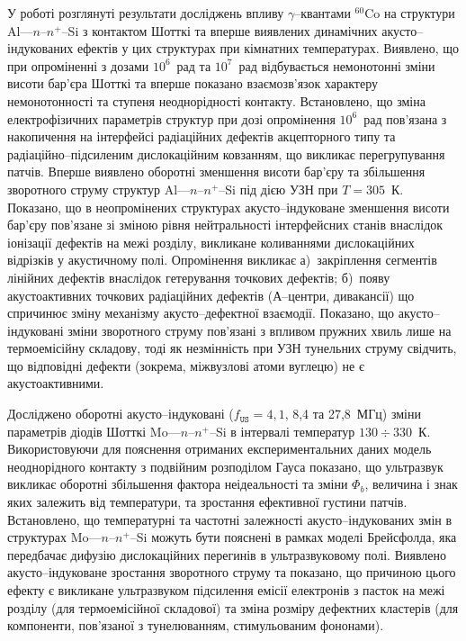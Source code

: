 У  роботі розглянуті результати досліджень
впливу $\gamma$--квантами $^{60}$Co на структури Al---$n$--$n^+$--Si з контактом Шотткі та
вперше виявлених динамічних акусто--індукованих ефектів у цих структурах при кімнатних температурах.
Виявлено, що при
опроміненні  з дозами $10^6$~рад та $10^7$~рад відбувається
немонотонні зміни висоти бар'єра Шотткі та вперше показано взаємозв'язок характеру немонотонності та ступеня неоднорідності контакту.
Встановлено, що зміна електрофізичних параметрів структур при дозі опромінення $10^6$~рад
пов'язана з накопичення на інтерфейсі радіаційних дефектів акцепторного типу та радіаційно--підсиленим дислокаційним ковзанням, що викликає перегрупування патчів.
Вперше виявлено оборотні зменшення висоти бар'єру та збільшення зворотного струму  структур Al---$n$--$n^+$--Si під дією УЗН при $T=305$~К.
Показано, що в неопромінених структурах акусто--індуковане зменшення висоти бар'єру пов'язане зі зміною рівня нейтральності інтерфейсних станів
внаслідок іонізації дефектів на межі розділу, викликане коливаннями дислокаційних відрізків у акустичному полі.
Опромінення викликає
а)~закріплення сегментів лінійних дефектів внаслідок гетерування точкових дефектів;
б)~появу акустоактивних точкових радіаційних дефектів (А--центри, дивакансії)
що спричинює зміну механізму акусто--дефектної взаємодії.
Показано, що акусто--індуковані зміни зворотного струму пов'язані з впливом пружних хвиль лише на термоемісійну складову,
тоді як незмінність при УЗН тунельних струму свідчить, що відповідні дефекти (зокрема, міжвузлові атоми вуглецю) не є акустоактивними.


Досліджено оборотні акусто--індуковані ($f_\mathtt{US}=4,1$, 8,4 та 27,8~МГц) зміни параметрів діодів Шотткі Mo---$n$--$n^+$--Si в інтервалі температур $130\div330$~К.
Використовуючи для пояснення отриманих експериментальних даних модель неоднорідного контакту з подвійним розподілом Гауса
показано, що ультразвук викликає оборотні збільшення фактора неідеальності та зміни $\Phi_{b}$,
величина і знак яких залежить від температури,
та зростання ефективної густини патчів.
Встановлено, що температурні та частотні залежності акусто--індукованих змін в структурах
 Mo---$n$--$n^+$--Si  можуть бути пояснені в рамках моделі Брейсфолда,
яка передбачає дифузію дислокаційних перегинів в ультразвуковому полі.
Виявлено акусто--індуковане зростання зворотного струму та показано, що причиною цього ефекту є викликане ультразвуком підсилення емісії електронів з пасток на межі розділу (для термоемісійної складової) та зміна розміру дефектних кластерів (для компоненти, пов'язаної з тунелюванням, стимульованим фононами).

